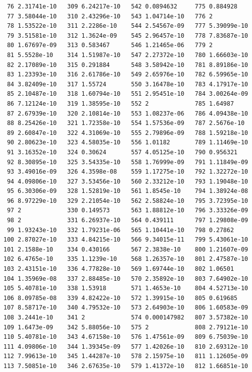 \documentclass{article}
\begin{document}
\begin{verbatim}
 76 2.31741e-10   309 6.24217e-10   542 0.0894632     775 0.884928
 77 3.58044e-10   310 2.43296e-10   543 1.04714e-10   776 2
 78 1.53522e-10   311 2.2286e-10    544 2.54567e-09   777 5.39099e-10
 79 3.51581e-10   312 1.3624e-09    545 2.96457e-10   778 7.83687e-10
 80 1.67697e-09   313 0.583467      546 1.21465e-06   779 2
 81 5.5528e-10    314 1.51987e-10   547 2.27372e-10   780 1.66603e-10
 82 2.17089e-10   315 0.291884      548 3.58942e-10   781 8.89186e-10
 83 1.23393e-10   316 2.61786e-10   549 2.65976e-10   782 6.59965e-10
 84 3.82409e-10   317 1.55724       550 3.16478e-10   783 4.17917e-10
 85 2.10487e-10   318 1.60794e-10   551 2.95451e-10   784 3.00264e-09
 86 7.12124e-10   319 1.38595e-10   552 2             785 1.64987
 87 2.67939e-10   320 2.10814e-10   553 1.08237e-06   786 4.09438e-10
 88 8.25426e-10   321 1.72358e-10   554 1.57536e-09   787 2.5676e-10
 89 2.60847e-10   322 4.31069e-10   555 2.79896e-09   788 1.59218e-10
 90 2.80623e-10   323 4.58035e-10   556 1.01182       789 1.11469e-10
 91 3.16352e-10   324 0.30624       557 4.05125e-10   790 0.956321
 92 8.30895e-10   325 3.54335e-10   558 1.76999e-09   791 1.11849e-09
 93 3.49016e-09   326 4.3598e-08    559 1.17275e-10   792 1.32272e-10
 94 4.09806e-10   327 3.53456e-10   560 2.33212e-10   793 1.19048e-10
 95 6.30306e-09   328 1.52819e-10   561 1.8545e-10    794 1.38924e-08
 96 8.97229e-10   329 2.21054e-10   562 2.58824e-10   795 3.72395e-10
 97 2             330 0.149573      563 1.88812e-10   796 3.33326e-09
 98 2             331 6.26937e-10   564 0.439111      797 1.29808e-09
 99 1.93243e-10   332 1.79231e-06   565 1.10441e-10   798 0.27862
100 2.87027e-10   333 4.84215e-10   566 9.34015e-11   799 5.43061e-10
101 2.1588e-10    334 0.430166      567 2.3838e-10    800 1.21607e-09
102 6.4765e-10    335 1.1239e-10    568 1.26357e-10   801 2.47587e-10
103 2.43151e-10   336 4.77828e-10   569 1.69744e-10   802 1.06501
104 1.35969e-08   337 2.88485e-10   570 2.35892e-10   803 7.64902e-10
105 5.40781e-10   338 1.53918       571 1.4653e-10    804 4.52713e-10
106 8.09785e-08   339 4.82422e-10   572 1.39915e-10   805 0.619685
107 8.58717e-10   340 4.79532e-10   573 2.64903e-10   806 1.60583e-09
108 3.2441e-10    341 2             574 0.000147982   807 3.57382e-10
109 1.6473e-09    342 5.88056e-10   575 2             808 2.79121e-10
110 5.40781e-10   343 4.67158e-10   576 1.47561e-09   809 6.75039e-10
111 4.09806e-10   344 1.39345e-09   577 1.42026e-10   810 2.69312e-10
112 7.99613e-10   345 1.44287e-10   578 2.15975e-10   811 1.12605e-09
113 7.50851e-10   346 2.67635e-10   579 1.41372e-10   812 1.66851e-10

\end{verbatim}
\end{document}
